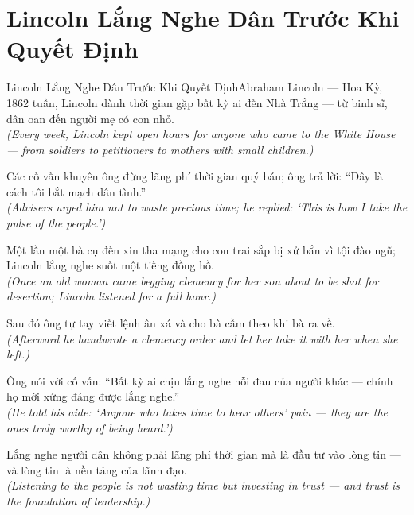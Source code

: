 \section{Lincoln Lắng Nghe Dân Trước Khi Quyết Định}
\begin{truyen}{Lincoln Lắng Nghe Dân Trước Khi Quyết Định}{Abraham Lincoln --- Hoa Kỳ, 1862}
 tuần, Lincoln dành thời gian gặp bất kỳ ai đến Nhà Trắng --- từ binh sĩ, dân oan đến người mẹ có con nhỏ.\\[4pt]
\textit{(Every week, Lincoln kept open hours for anyone who came to the White House --- from soldiers to petitioners to mothers with small children.)}

Các cố vấn khuyên ông đừng lãng phí thời gian quý báu; ông trả lời: ``Đây là cách tôi bắt mạch dân tình.''\\[4pt]
\textit{(Advisers urged him not to waste precious time; he replied: `This is how I take the pulse of the people.')}

Một lần một bà cụ đến xin tha mạng cho con trai sắp bị xử bắn vì tội đào ngũ; Lincoln lắng nghe suốt một tiếng đồng hồ.\\[4pt]
\textit{(Once an old woman came begging clemency for her son about to be shot for desertion; Lincoln listened for a full hour.)}

Sau đó ông tự tay viết lệnh ân xá và cho bà cầm theo khi bà ra về.\\[4pt]
\textit{(Afterward he handwrote a clemency order and let her take it with her when she left.)}

Ông nói với cố vấn: ``Bất kỳ ai chịu lắng nghe nỗi đau của người khác --- chính họ mới xứng đáng được lắng nghe.''\\[4pt]
\textit{(He told his aide: `Anyone who takes time to hear others' pain --- they are the ones truly worthy of being heard.')}

\end{truyen}
\begin{baihoc}
  Lắng nghe người dân không phải lãng phí thời gian mà là đầu tư vào lòng tin --- và lòng tin là nền tảng của lãnh đạo.\\[4pt]
  \textit{(Listening to the people is not wasting time but investing in trust --- and trust is the foundation of leadership.)}
\end{baihoc}

